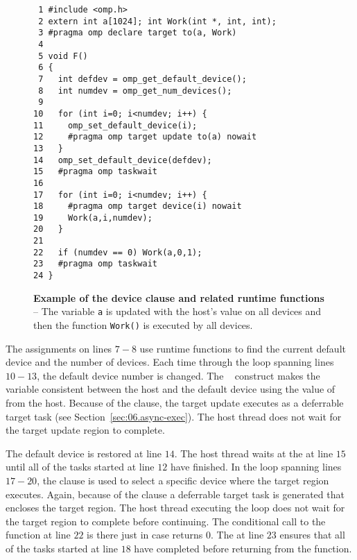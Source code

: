 \begin{figure*}[!tb]
\begin{verbatim}
 1 #include <omp.h>
 2 extern int a[1024]; int Work(int *, int, int);
 3 #pragma omp declare target to(a, Work)
 4 
 5 void F()
 6 {
 7   int defdev = omp_get_default_device();
 8   int numdev = omp_get_num_devices();
 9 
10   for (int i=0; i<numdev; i++) {
11     omp_set_default_device(i);
12     #pragma omp target update to(a) nowait
13   }
14   omp_set_default_device(defdev);
15   #pragma omp taskwait
16 
17   for (int i=0; i<numdev; i++) {
18     #pragma omp target device(i) nowait
19     Work(a,i,numdev);
20   }
21 
22   if (numdev == 0) Work(a,0,1);
23   #pragma omp taskwait
24 }
\end{verbatim}
\caption{ \textbf {Example of the device clause and related runtime functions} -- \small
          The variable \texttt{a} is updated with the host's value on all devices
          and then the function \texttt{Work()} is executed by all devices.
         }
\label{figure:chapter6-device}
\end{figure*}

The assignments on lines $7-8$ use runtime functions to find the current
default device and the number of devices.  Each time through the loop spanning
lines $10-13$, the default device number is changed. The
~ construct makes the variable  consistent between
the host and the default device using the value of  from the host. Because
of the  clause, the target update executes as a deferrable target
task (see Section~\ref{sec:06.async-exec}).  The host thread does not wait for
the target update region to complete.  

The default device is restored at line $14$.  The host thread waits at the
 at line $15$ until all of the tasks started at line $12$ have
finished.  In the loop spanning lines $17-20$, the  clause is used
to select a specific device where the target region executes.  Again, because
of the  clause a deferrable target task is generated that encloses
the target region.  The host thread executing the loop does not wait for the
target region to complete before continuing.  The conditional call to the
function  at line $22$ is there just in case 
returns 0.  The  at line $23$ ensures that all of the tasks
started at line $18$ have completed before returning from the function.

